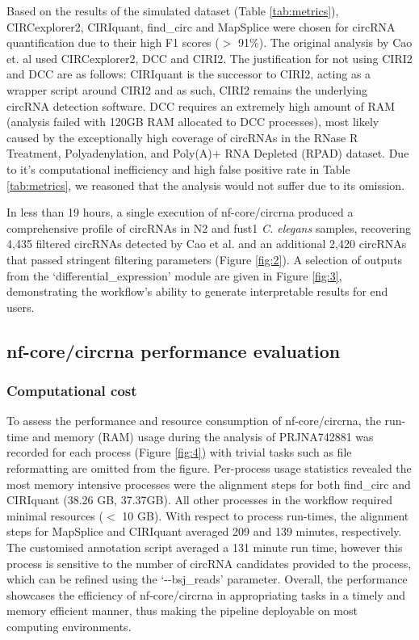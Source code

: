 \documentclass{bmcart}
\begin{document}
Based on the results of the simulated dataset (Table \ref{tab:metrics}), CIRCexplorer2, CIRIquant, find\_circ and MapSplice were chosen for circRNA quantification due to their high F1 scores ($>$ 91\%). The original analysis by Cao et. al used CIRCexplorer2, DCC and CIRI2. The justification for not using CIRI2 and DCC are as follows: CIRIquant is the successor to CIRI2, acting as a wrapper script around CIRI2 and as such, CIRI2 remains the underlying circRNA detection software. DCC requires an extremely high amount of RAM (analysis failed with 120GB RAM allocated to DCC processes), most likely caused by the exceptionally high coverage of circRNAs in the RNase R Treatment, Polyadenylation, and Poly(A)$+$ RNA Depleted (RPAD) dataset. Due to it's computational inefficiency and high false positive rate in Table \ref{tab:metrics}, we reasoned that the analysis would not suffer due to its omission. \par
In less than 19 hours, a single execution of nf-core/circrna produced a comprehensive profile of circRNAs in N2 and fust1 \textit{C. elegans} samples, recovering 4,435 filtered circRNAs detected by Cao et al. and an additional 2,420 circRNAs that passed stringent filtering parameters (Figure \ref{fig:2}). A selection of outputs from the `differential\_expression' module are given in Figure \ref{fig:3}, demonstrating the workflow's ability to generate interpretable results for end users. 

\subsection*{\textbf{nf-core/circrna performance evaluation}}
\subsubsection*{\textbf{Computational cost}}
To assess the performance and resource consumption of nf-core/circrna, the run-time and memory (RAM) usage during the analysis of PRJNA742881 was recorded for each process (Figure \ref{fig:4}) with trivial tasks such as file reformatting are omitted from the figure. Per-process usage statistics revealed the most memory intensive processes were the alignment steps for both find\_circ and CIRIquant (38.26 GB, 37.37GB). All other processes in the workflow required minimal resources ($<$ 10 GB). With respect to process run-times, the alignment steps for MapSplice and CIRIquant averaged 209 and 139 minutes, respectively. The customised annotation script averaged a 131 minute run time, however this process is sensitive to the number of circRNA candidates provided to the process, which can be refined using the `-{}-bsj\_reads' parameter. Overall, the performance showcases the efficiency of nf-core/circrna in appropriating tasks in a timely and memory efficient manner, thus making the pipeline deployable on most computing environments. 
\end{document}
